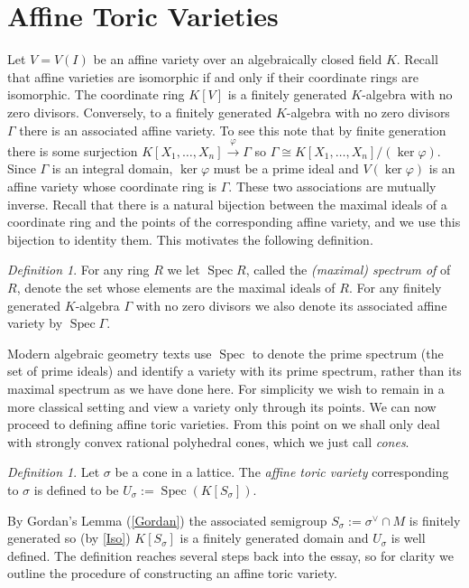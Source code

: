 \documentclass[BSc]{usydthesis}
\numberwithin{equation}{chapter}
\theoremstyle{remark}
\newtheorem{Definition}[equation]{Definition}
\newcommand{\V}{\vee}
\DeclareMathOperator{\Spec}{Spec}
\begin{document}
\section{Affine Toric Varieties}

Let $V=V(I)$ be an affine variety over an algebraically closed field $K.$ Recall that affine varieties are isomorphic if and only if their coordinate rings are isomorphic. The coordinate ring $K[V]$ is a finitely generated $K$-algebra with no zero divisors. Conversely, to a finitely generated $K$-algebra with no zero divisors $\Gamma$ there is an associated affine variety. To see this note that by finite generation there is some surjection $K[X_1,\ldots, X_n] \xrightarrow{\varphi} \Gamma$ so $\Gamma \cong K[X_1, \ldots, X_n]/(\ker \varphi).$ Since $\Gamma$ is an integral domain, $\ker \varphi$ must be a prime ideal and $V(\ker \varphi)$ is an affine variety whose coordinate ring is $\Gamma.$ These two associations are mutually inverse. Recall that there is a natural bijection between the maximal ideals of a coordinate ring and the points of the corresponding affine variety, and we use this bijection to identity them. This motivates the following definition.

\begin{Definition}
For any ring $R$ we let $\Spec R$, called the {\em (maximal) spectrum of} of $R$, denote the set whose elements are the maximal ideals of $R.$ For any finitely generated $K$-algebra $\Gamma$ with no zero divisors we also denote its associated affine variety by $\Spec \Gamma.$
\end{Definition}

Modern algebraic geometry texts use $\Spec$ to denote the prime spectrum (the set of prime ideals) and identify a variety with its prime spectrum, rather than its maximal spectrum as we have done here. For simplicity we wish to remain in a more classical setting and view a variety only through its points. 
We can now proceed to defining affine toric varieties. From this point on we shall only deal with strongly convex rational polyhedral cones, which we just call {\em cones}.

\begin{Definition}Let $\sigma$ be a cone in a lattice. The {\em affine toric variety} corresponding to $\sigma$ is defined to be $U_{\sigma}:= \Spec (K[S_{\sigma}]).$ 
\end{Definition}

By Gordan's Lemma (\ref{Gordan}) the associated semigroup $S_{\sigma}:= \sigma^{\V} \cap M$ is finitely generated so (by \ref{Iso}) $K[S_{\sigma}]$ is a finitely generated domain and $U_{\sigma}$ is well defined. The definition reaches several steps back into the essay, so for clarity we outline the procedure of constructing an affine toric variety. 
\end{document}
